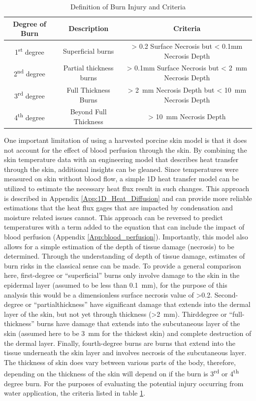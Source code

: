\documentclass[12pt,oneside]{book}
\begin{document}
\begin{table} [H]
\caption{Definition of Burn Injury and Criteria}
\label{tab:Burn_Inj_Criteria}
\begin{tabular}{|c|c|c|}
\hline
Degree of Burn 					& Description				& Criteria 												\\ \hline \hline
1\textsuperscript{st} degree 	& Superficial burns			& > 0.2 Surface Necrosis but < 0.1mm Necrosis Depth		\\ \hline
2\textsuperscript{nd} degree 	& Partial thickness burns 	& > 0.1mm Surface Necrosis but < 2~mm Necrosis Depth 	\\ \hline
3\textsuperscript{rd} degree 	& Full Thickness Burns		& > 2~mm Necrosis Depth but < 10~mm Necrosis Depth 		\\ \hline
4\textsuperscript{th} degree 	& Beyond Full Thickness		& > 10~mm Necrosis Depth 								\\ \hline
\end{tabular}
\end{table}

One important limitation of using a harvested porcine skin model is that it does not account for the effect of blood perfusion through the skin. By combining the skin temperature data with an engineering model that describes heat transfer through the skin, additional insights can be gleaned.  Since temperatures were measured on skin without blood flow, a simple 1\-D heat transfer model can be utilized to estimate the necessary heat flux result in such changes.  This approach is described in Appendix \ref{App:1D_Heat_Diffusion} and can provide more reliable estimations that the heat flux gages that are impacted by condensation and moisture related issues cannot.  This approach can be reversed to predict temperatures with a term added to the equation that can include the impact of blood perfusion (Appendix \ref{App:blood_perfusion}).  Importantly, this model also allows for a simple estimation of the depth of tissue damage (necrosis) to be determined.  Through the understanding of depth of tissue damage, estimates of burn risks in the classical sense can be made. To provide a general comparison here, first-degree or ``superficial'' burns only involve damage to the skin in the epidermal layer (assumed to be less than 0.1~mm), for the purpose of this analysis this would be a dimensionless surface necrosis value of \textgreater 0.2. Second-degree or ``partial\-thickness'' have significant damage that extends into the dermal layer of the skin, but not yet through thickness (\textgreater 2~mm). Third\-degree or ``full-thickness'' burns have damage that extends into the subcutaneous layer of the skin (assumed here to be 3~mm for the thickest skin) and complete destruction of the dermal layer. Finally, fourth-degree burns are burns that extend into the tissue underneath the skin layer and involves necrosis of the subcutaneous layer. The thickness of skin does vary between various parts of the body, therefore, depending on the thickness of the skin will depend on if the burn is 3\textsuperscript{rd} or 4\textsuperscript{th} degree burn. For the purposes of evaluating the potential injury occurring from water application, the criteria listed in table \ref{tab:Burn_Inj_Criteria}.  
\end{document}

